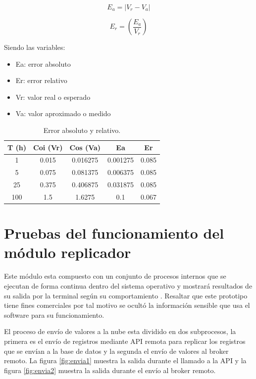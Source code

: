 \begin{equation}
	\label{eq:ea}
	E_a = \left| V_r - V_a \right|
\end{equation}

\begin{equation}
	\label{eq:er}
	E_r = \left( \frac{E_a}{V_r} \right)
\end{equation}

\vspace{1.0cm}
Siendo las variables:
\begin{itemize}
\item Ea: error absoluto 
\item Er: error relativo
\item Vr: valor real o esperado
\item Va: valor aproximado o medido
\end{itemize}

\vspace{0.5cm}
\begin{table}[h]
	\centering
	\caption[Error absoluto y relativo]{Error absoluto y relativo.}
	\begin{tabular}{c c c c c}    
		\toprule
		\textbf{T (h)} & \textbf{Coi (Vr)} &\textbf{Cos (Va)} &\textbf{Ea} &\textbf{Er}\\
		\midrule
		1 & 0.015 & 0.016275 & 0.001275 & 0.085 \\		
		5 & 0.075 & 0.081375 & 0.006375 & 0.085 \\
		25 & 0.375 & 0.406875 & 0.031875 & 0.085\\		
		100 & 1.5 & 1.6275 & 0.1 & 0.067\\		
		
		\bottomrule
		\hline
	\end{tabular}
	\label{tab:tablaerror}
\end{table}

\section{Pruebas del funcionamiento del módulo replicador}

Este módulo esta compuesto con un conjunto de procesos internos que se ejecutan de forma continua dentro del sistema operativo y mostrará resultados de su salida por la terminal según su comportamiento . Resaltar que este prototipo tiene fines comerciales por tal motivo se ocultó la información sensible que usa el software para su funcionamiento.

El proceso de envío de valores a la nube esta dividido en dos subprocesos, la primera es el envío de registros mediante API remota para replicar los registros que se envían a la base de datos y la segunda el envío de valores al broker remoto. La figura \ref{fig:envia1} muestra la salida durante el llamado a la API y la figura \ref{fig:envia2} muestra la salida durante el envío al broker remoto.

